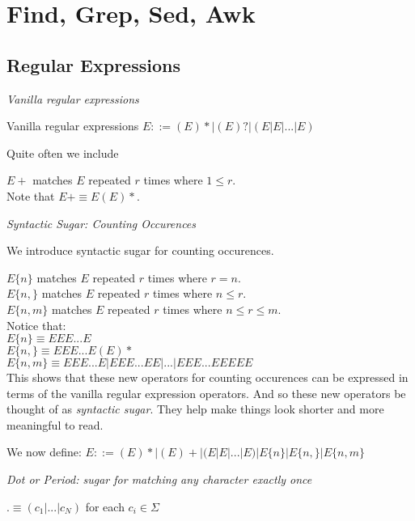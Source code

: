 \chapter{Find, Grep, Sed, Awk}



\section{Regular Expressions}

\frmrule 

\textit{Vanilla regular expressions}

Vanilla regular expressions
$E ::= (E)* | (E)? | (E|E|...|E)$

Quite often 
we include 

$E+$ matches $E$ repeated $r$ times where $1 \leqslant r$.\\
Note that $E+ \equiv E(E)*$.

\frmrule 

\textit{Syntactic Sugar: Counting Occurences}

We introduce syntactic sugar for counting occurences. 

$E\{n\}$ matches $E$ repeated $r$ times where $r = n$.\\
$E\{n,\}$ matches $E$ repeated $r$ times where $n \leqslant r$.\\
$E\{n,m\}$ matches $E$ repeated $r$ times where $n \leqslant r \leqslant m$.\\

Notice that:\\
$E\{n\} \equiv EEE...E$\\
$E\{n,\} \equiv EEE...E(E)*$\\
$E\{n,m\} \equiv EEE...E|EEE...EE|...|EEE...EEEEE$\\
This shows that these new operators for counting occurences can be expressed in terms 
of the vanilla regular expression 
operators. And so these new operators be thought of as \textit{syntactic sugar}. 
They help make things look shorter and more meaningful to read. 

We now define:
$E ::= (E)* | (E)+ | (E|E|...|E) | E\{n\} | E\{n,\} | E\{n,m\}$\\

\frmrule 

\textit{Dot or Period: sugar for matching any character exactly once}

$. \equiv (c_1 | ... | c_N)$ 
for each $c_i \in \Sigma$

\frmrule 

